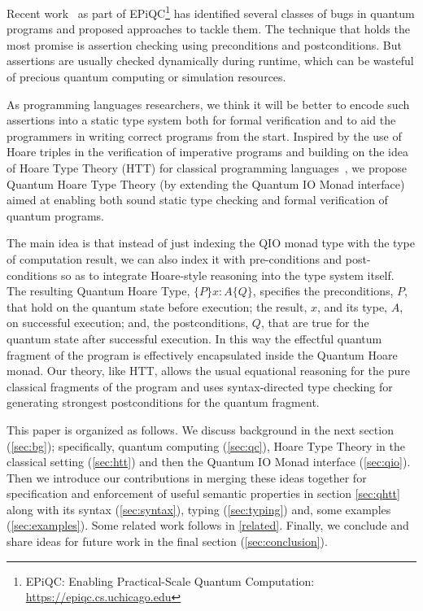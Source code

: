 \documentclass[acmsmall,nonacm,timestamp]{acmart}
\begin{document}
Recent work~\cite{huang_qdb:_2018,huang_statistical_2019} as part of EPiQC\footnote{EPiQC: Enabling Practical-Scale Quantum Computation:  \url{https://epiqc.cs.uchicago.edu}} has identified several classes of bugs in quantum programs and proposed approaches to tackle them. The technique that holds the most promise is assertion checking using preconditions and postconditions. But assertions are usually checked dynamically during runtime, which can be wasteful of precious quantum computing or simulation resources.

As programming languages researchers, we think it will be better to encode such assertions into a static type system both for formal verification and to aid the programmers in writing correct programs from the start. Inspired by the use of Hoare triples in the verification of imperative programs and building on the idea of Hoare Type Theory (HTT) for classical programming languages~\cite{nanevski_hoare_2008}, we propose Quantum Hoare Type Theory (by extending the Quantum IO Monad interface\cite{qio}) aimed at enabling both sound static type checking and formal verification of quantum programs.

The main idea is that instead of just indexing the QIO monad type with the type of computation result, we can also index it with pre-conditions and post-conditions so as to integrate Hoare-style reasoning into the type system itself. The resulting Quantum Hoare Type, $\{P\} x{ : }A \{Q\}$, specifies the preconditions, $P$, that hold on the quantum state before execution; the result, $x$, and its type, $A$, on successful execution; and, the postconditions, $Q$, that are true for the quantum state after successful execution. In this way the effectful quantum fragment of the program is effectively encapsulated inside the Quantum Hoare monad. Our theory, like HTT, allows the usual equational reasoning for the pure classical fragments of the program and uses syntax-directed type checking for generating strongest postconditions for the quantum fragment.

This paper is organized as follows. We discuss background in the next section (\cref{sec:bg}); specifically, quantum computing (\cref{sec:qc}),  Hoare Type Theory in the classical setting (\cref{sec:htt}) and then the Quantum IO Monad interface (\cref{sec:qio}). Then we introduce our contributions in merging these ideas together for specification and enforcement of useful semantic properties in section \cref{sec:qhtt} along with its syntax (\cref{sec:syntax}), typing (\cref{sec:typing}) and, some examples (\cref{sec:examples}). Some related work follows in \cref{related}. Finally, we conclude and share ideas for future work in the final section (\cref{sec:conclusion}).
\end{document}
